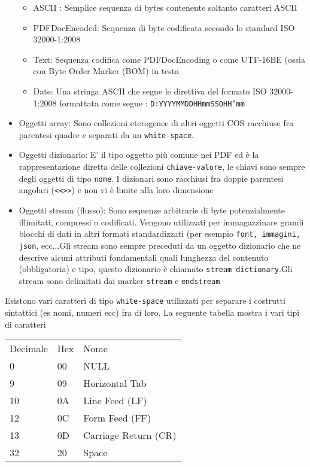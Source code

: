\begin{itemize}
\begin{itemize}
		\item ASCII : Semplice sequenza di bytes contenente soltanto caratteri ASCII
		\item PDFDocEncoded: Sequenza di byte codificata secondo lo standard ISO 32000-1:2008 
		\item Text: Sequenza codifica come PDFDocEncoding o come UTF-16BE (ossia con Byte Order Marker (BOM) in testa
		\item Date: Una stringa ASCII che segue le direttiva del formato ISO 32000-1:2008 formattata come segue : \texttt{D:YYYYMMDDHHmmSSOHH’mm}
	\end{itemize}
	 \item Oggetti array: Sono collezioni eterogenee di altri oggetti COS racchiuse fra parentesi quadre e separati da un \texttt{white-space}.
	 \item Oggetti dizionario: E' il tipo oggetto più comune nei PDF ed è la rappresentazione diretta delle collezioni \texttt{chiave-valore}, le chiavi sono sempre degli oggetti di tipo \texttt{nome}. I dizionari sono racchiusi fra doppie parentesi angolari (\texttt{<<>>}) e non vi è limite alla loro dimensione
	 \item Oggetti stream (flusso): Sono sequenze arbitrarie di byte potenzialmente illimitati, compressi o codificati. Vengono utilizzati per immagazzinare grandi blocchi di dati in altri formati standardizzati (per esempio \texttt{font, immagini, json}, ecc...\newline Gli stream sono sempre preceduti da un oggetto dizionario che ne descrive alcuni attributi fondamentali quali lunghezza del contenuto (obbligatoria) e tipo, questo dizionario è chiamato \texttt{stream dictionary}.\newline Gli stream sono delimitati dai marker \texttt{stream} e \texttt{endstream}
	\end{itemize}
Esistono vari caratteri di tipo \texttt{white-space} utilizzati per separare i costrutti sintattici (es nomi, numeri ecc) fra di loro.
La seguente tabella mostra i vari tipi di caratteri
\newline
\begin{table}[h]
\center
\begin{tabular}{lll}
Decimale & Hex & Nome                 \\
0        & 00  & NULL                 \\
9        & 09  & Horizontal Tab       \\
10       & 0A  & Line Feed (LF)       \\
12       & 0C  & Form Feed (FF)       \\
13       & 0D  & Carriage Return (CR) \\
32       & 20  & Space               
\end{tabular}
\end{table}
